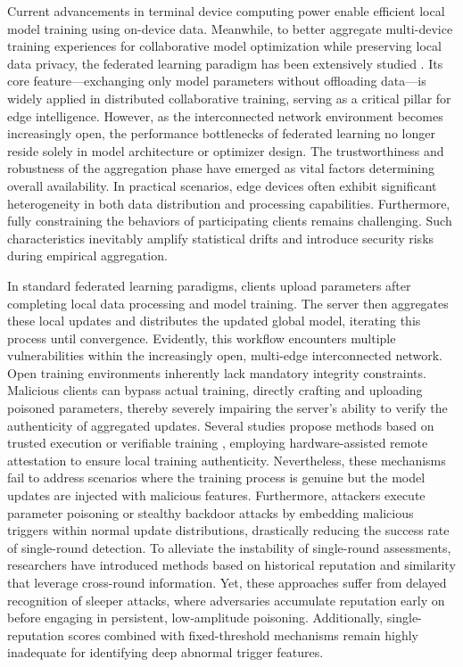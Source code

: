 \documentclass[11pt, a4paper]{article}
\begin{document}
Current advancements in terminal device computing power enable efficient local model training using on-device data. Meanwhile, to better aggregate multi-device training experiences for collaborative model optimization while preserving local data privacy, the federated learning paradigm has been extensively studied \cite{kairouz2021flsurvey}. Its core feature---exchanging only model parameters without offloading data---is widely applied in distributed collaborative training, serving as a critical pillar for edge intelligence. However, as the interconnected network environment becomes increasingly open, the performance bottlenecks of federated learning no longer reside solely in model architecture or optimizer design. The trustworthiness and robustness of the aggregation phase have emerged as vital factors determining overall availability. In practical scenarios, edge devices often exhibit significant heterogeneity in both data distribution and processing capabilities. Furthermore, fully constraining the behaviors of participating clients remains challenging. Such characteristics inevitably amplify statistical drifts and introduce security risks during empirical aggregation.

In standard federated learning paradigms, clients upload parameters after completing local data processing and model training. The server then aggregates these local updates and distributes the updated global model, iterating this process until convergence. Evidently, this workflow encounters multiple vulnerabilities within the increasingly open, multi-edge interconnected network. Open training environments inherently lack mandatory integrity constraints. Malicious clients can bypass actual training, directly crafting and uploading poisoned parameters, thereby severely impairing the server's ability to verify the authenticity of aggregated updates. Several studies propose methods based on trusted execution or verifiable training \cite{lu2025tmt,zhang2025rppfl,r1_tee_integrity}, employing hardware-assisted remote attestation to ensure local training authenticity. Nevertheless, these mechanisms fail to address scenarios where the training process is genuine but the model updates are injected with malicious features. Furthermore, attackers execute parameter poisoning or stealthy backdoor attacks \cite{bagdasaryan2020backdoor,wang2019neuralcleanse} by embedding malicious triggers within normal update distributions, drastically reducing the success rate of single-round detection. To alleviate the instability of single-round assessments, researchers have introduced methods based on historical reputation and similarity \cite{cao2021fltrust,fung2020foolsgold} that leverage cross-round information. Yet, these approaches suffer from delayed recognition of sleeper attacks, where adversaries accumulate reputation early on before engaging in persistent, low-amplitude poisoning. Additionally, single-reputation scores combined with fixed-threshold mechanisms remain highly inadequate for identifying deep abnormal trigger features.
\end{document}
